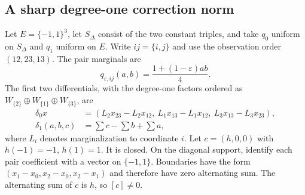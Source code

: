 \documentclass[11pt,a4paper]{article}
\numberwithin{equation}{section}
\theoremstyle{remark}
\begin{document}
\subsection{A sharp degree-one correction norm}\label{subsec:triangle}
Let $E=\{-1,1\}^3$, let $S_\Delta$ consist of the two constant triples, and take $q_0$ uniform on $S_\Delta$ and $q_1$ uniform on $E$. Write $ij=\{i,j\}$ and use the observation order $(12,23,13)$. The pair marginals are
\[
 q_{\varepsilon,ij}(a,b)=\frac{1+(1-\varepsilon)ab}{4}.
\]
The first two differentials, with the degree-one factors ordered as $W_{\{2\}}\oplus W_{\{1\}}\oplus W_{\{3\}}$, are
\begin{align*}
 \delta_0x&=(L_2x_{23}-L_2x_{12},\ L_1x_{13}-L_1x_{12},\ L_3x_{13}-L_3x_{23}),\\
 \delta_1(a,b,c)&=\sum c-\sum b+\sum a,
\end{align*}
where $L_i$ denotes marginalization to coordinate $i$. Let $c=(h,0,0)$ with $h(-1)=-1$, $h(1)=1$. It is closed. On the diagonal support, identify each pair coefficient with a vector on $\{-1,1\}$. Boundaries have the form $(x_1-x_0,x_2-x_0,x_2-x_1)$ and therefore have zero alternating sum. The alternating sum of $c$ is $h$, so $[c]\ne0$.
\end{document}
